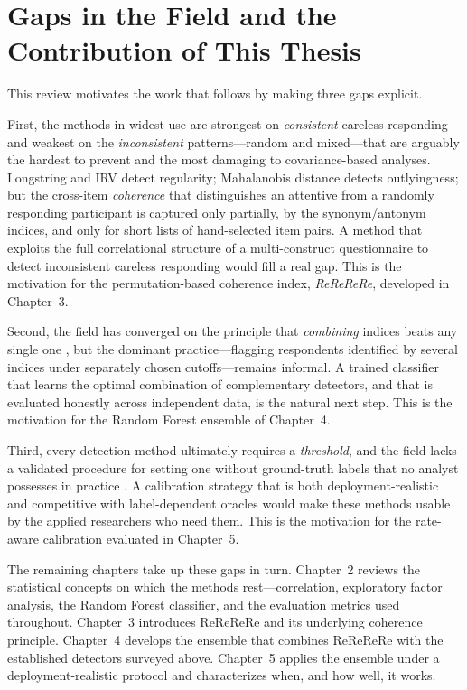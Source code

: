 \documentclass[doc,11pt,donotrepeattitle]{apa7}
\begin{document}
\section{Gaps in the Field and the Contribution of This Thesis}

This review motivates the work that follows by making three gaps explicit.

First, the methods in widest use are strongest on \emph{consistent} careless
responding and weakest on the \emph{inconsistent} patterns---random and
mixed---that are arguably the hardest to prevent and the most damaging to
covariance-based analyses. Longstring and IRV detect regularity; Mahalanobis
distance detects outlyingness; but the cross-item \emph{coherence} that
distinguishes an attentive from a randomly responding participant is captured
only partially, by the synonym/antonym indices, and only for short lists of
hand-selected item pairs. A method that exploits the full correlational
structure of a multi-construct questionnaire to detect inconsistent careless
responding would fill a real gap. This is the motivation for the
permutation-based coherence index, \emph{ReReReRe}, developed in Chapter~3.

Second, the field has converged on the principle that \emph{combining} indices
beats any single one \parencite{niessen2016detecting, curran2016methods,
schroeders2022detecting}, but the dominant practice---flagging respondents
identified by several indices under separately chosen cutoffs---remains
informal. A trained classifier that learns the optimal combination of
complementary detectors, and that is evaluated honestly across independent
data, is the natural next step. This is the motivation for the Random Forest
ensemble of Chapter~4.

Third, every detection method ultimately requires a \emph{threshold}, and the
field lacks a validated procedure for setting one without ground-truth labels
that no analyst possesses in practice \parencite{ward2023dealing,
alfons2024openscience}. A calibration strategy that is both deployment-realistic
and competitive with label-dependent oracles would make these methods usable by
the applied researchers who need them. This is the motivation for the
rate-aware calibration evaluated in Chapter~5.

The remaining chapters take up these gaps in turn. Chapter~2 reviews the
statistical concepts on which the methods rest---correlation, exploratory factor
analysis, the Random Forest classifier, and the evaluation metrics used
throughout. Chapter~3 introduces ReReReRe and its underlying coherence
principle. Chapter~4 develops the ensemble that combines ReReReRe with the
established detectors surveyed above. Chapter~5 applies the ensemble under a
deployment-realistic protocol and characterizes when, and how well, it works.

\printbibliography
\end{document}
